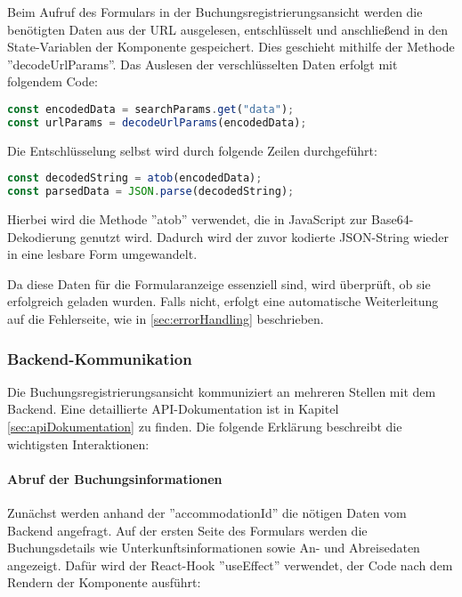 Beim Aufruf des Formulars in der Buchungsregistrierungsansicht werden die benötigten Daten aus der URL ausgelesen, entschlüsselt und anschließend in den State-Variablen der Komponente gespeichert. Dies geschieht mithilfe der Methode ''decodeUrlParams''. Das Auslesen der verschlüsselten Daten erfolgt mit folgendem Code:

\begin{lstlisting}[language=JavaScript]
const encodedData = searchParams.get("data"); 
const urlParams = decodeUrlParams(encodedData);
\end{lstlisting}

Die Entschlüsselung selbst wird durch folgende Zeilen durchgeführt:

\begin{lstlisting}[language=JavaScript]
const decodedString = atob(encodedData);
const parsedData = JSON.parse(decodedString);
\end{lstlisting}

Hierbei wird die Methode ''atob'' verwendet, die in JavaScript zur Base64-Dekodierung genutzt wird. Dadurch wird der zuvor kodierte JSON-String wieder in eine lesbare Form umgewandelt.  

Da diese Daten für die Formularanzeige essenziell sind, wird überprüft, ob sie erfolgreich geladen wurden. Falls nicht, erfolgt eine automatische Weiterleitung auf die Fehlerseite, wie in \ref{sec:errorHandling} beschrieben.  

\subsubsection{Backend-Kommunikation}
\label{sec:backendCom}

Die Buchungsregistrierungsansicht kommuniziert an mehreren Stellen mit dem Backend. Eine detaillierte API-Dokumentation ist in Kapitel \ref{sec:apiDokumentation} zu finden. Die folgende Erklärung beschreibt die wichtigsten Interaktionen:

\paragraph{Abruf der Buchungsinformationen}
Zunächst werden anhand der ''accommodationId'' die nötigen Daten vom Backend angefragt. Auf der ersten Seite des Formulars werden die Buchungsdetails wie Unterkunftsinformationen sowie An- und Abreisedaten angezeigt. Dafür wird der React-Hook ''useEffect'' verwendet, der Code nach dem Rendern der Komponente ausführt:

